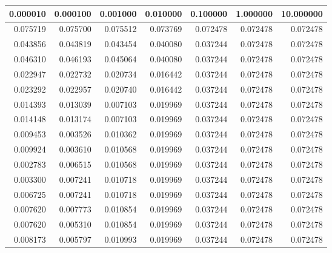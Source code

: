\begin{tabular}{rrrrrrr}
\toprule
0.000010 & 0.000100 & 0.001000 & 0.010000 & 0.100000 & 1.000000 & 10.000000 \\
\midrule
0.075719 & 0.075700 & 0.075512 & 0.073769 & 0.072478 & 0.072478 & 0.072478 \\
0.043856 & 0.043819 & 0.043454 & 0.040080 & 0.037244 & 0.072478 & 0.072478 \\
0.046310 & 0.046193 & 0.045064 & 0.040080 & 0.037244 & 0.072478 & 0.072478 \\
0.022947 & 0.022732 & 0.020734 & 0.016442 & 0.037244 & 0.072478 & 0.072478 \\
0.023292 & 0.022957 & 0.020740 & 0.016442 & 0.037244 & 0.072478 & 0.072478 \\
0.014393 & 0.013039 & 0.007103 & 0.019969 & 0.037244 & 0.072478 & 0.072478 \\
0.014148 & 0.013174 & 0.007103 & 0.019969 & 0.037244 & 0.072478 & 0.072478 \\
0.009453 & 0.003526 & 0.010362 & 0.019969 & 0.037244 & 0.072478 & 0.072478 \\
0.009924 & 0.003610 & 0.010568 & 0.019969 & 0.037244 & 0.072478 & 0.072478 \\
0.002783 & 0.006515 & 0.010568 & 0.019969 & 0.037244 & 0.072478 & 0.072478 \\
0.003300 & 0.007241 & 0.010718 & 0.019969 & 0.037244 & 0.072478 & 0.072478 \\
0.006725 & 0.007241 & 0.010718 & 0.019969 & 0.037244 & 0.072478 & 0.072478 \\
0.007620 & 0.007773 & 0.010854 & 0.019969 & 0.037244 & 0.072478 & 0.072478 \\
0.007620 & 0.005310 & 0.010854 & 0.019969 & 0.037244 & 0.072478 & 0.072478 \\
0.008173 & 0.005797 & 0.010993 & 0.019969 & 0.037244 & 0.072478 & 0.072478 \\
\bottomrule
\end{tabular}
